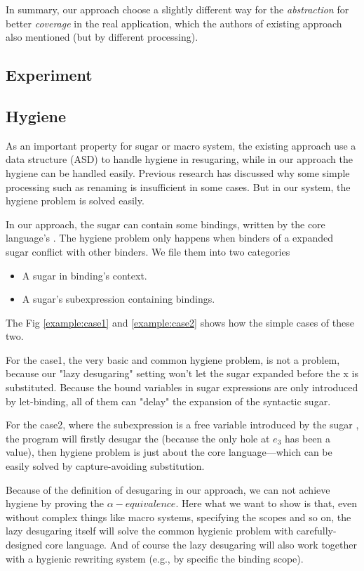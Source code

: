 In summary, our approach choose a slightly different way for the \emph{abstraction} for better \emph{coverage} in the real application, which the authors of existing approach also mentioned (but by different processing).

\subsection{Experiment}


\subsection{Hygiene}

As an important property for sugar or macro system, the existing approach use a data structure (ASD) to handle hygiene in resugaring, while in our approach the hygiene can be handled easily. Previous research\cite{EssenceofHygiene} has discussed why some simple processing such as renaming is insufficient in some cases. But in our system, the hygiene problem is solved easily. 

In our approach, the sugar can contain some bindings, written by the core language's . The hygiene problem only happens when binders of a expanded sugar conflict with other binders. We file them into two categories
\begin{itemize}
\item A sugar in binding's context.
\item A sugar's subexpression containing bindings.
\end{itemize}
The Fig \ref{example:case1} and \ref{example:case2} shows how the simple cases of these two.


For the case1, the very basic and common hygiene problem, is not a problem, because our "lazy desugaring" setting won't let the sugar  expanded before the x is substituted. Because the bound variables in sugar expressions are only introduced by let-binding, all of them can "delay" the expansion of the syntactic sugar.

For the case2, where the subexpression  is a free variable introduced by the sugar , the program will firstly desugar the  (because the only hole at $e_3$ has been a value), then hygiene problem is just about the core language---which can be easily solved by capture-avoiding substitution.

Because of the definition of desugaring in our approach, we can not achieve hygiene by proving the $\alpha-equivalence$.
Here what we want to show is that, even without complex things like macro systems, specifying the scopes and so on, the lazy desugaring itself will solve the common hygienic problem with carefully-designed core language. And of course the lazy desugaring will also work together with a hygienic rewriting system (e.g., by specific the binding scope).
